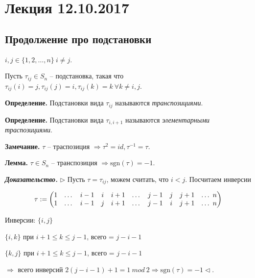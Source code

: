 \section{Лекция 12.10.2017}

\subsection{Продолжение про подстановки}

$i, j \in \{1, 2, \dots, n\} \ i \neq j$.

\vspace{\baselineskip}
Пусть $\tau_{ij} \in S_n$ -- подстановка, такая что $\tau_{ij}(i) = j, \tau_{ij}(j) = i, \tau_{ij}(k) = k \ \forall k \neq i,j$.

\vspace{\baselineskip}
\textbf{Определение.} Подстановки вида $\tau_{ij}$ называются \textit{транспозициями}.

\vspace{\baselineskip}
\textbf{Определение.} Подстановки вида $\tau_{i, i+1}$ называются \textit{элементарными траспозициями}.

\vspace{\baselineskip}
\textbf{Замечание.} $\tau$ -- траспозиция $\Rightarrow \tau^2 = id, \tau^{-1} = \tau$.

\vspace{\baselineskip}
\textbf{Лемма.} $\tau \in S_n$ -- транспозиция $\Rightarrow \mathrm{sgn}(\tau) = -1$.

\vspace{\baselineskip}
\textbf{\textit{Доказательство.}} $\rhd$ Пусть $\tau = \tau_{ij}$, можем считать, что $i < j$. Посчитаем инверсии

\begin{equation*}\tau := \begin{pmatrix} 
	1 & \dots & i-1 & i & i + 1 & \dots & 
	j - 1 & j & j + 1 & \dots \ n
	\cr 
	1 & \dots & i-1 & j & i + 1 & \dots & 
	j - 1 & i & j + 1 & \dots \ n
\end{pmatrix}\end{equation*}

Инверсии: $\{i, j\}$

$\{i, k\}$ при $i + 1 \leq k \leq j -1$, всего =  $j-i-1$

$\{k, j\}$ при $i + 1 \leq k \leq j -1$, всего =  $j-i-1$

$\Rightarrow$ всего инверсий $2(j-i-1) + 1 = 1 \ mod \ 2 \Rightarrow \mathrm{sgn}(\tau) = -1 \lhd$.

